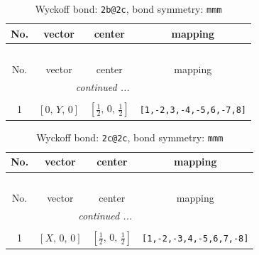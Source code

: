 \documentclass[fleqn,8pt]{jsarticle}
\begin{document}
\renewcommand{\arraystretch}{1.2}
\begin{longtable}{cccc}
\caption{Wyckoff bond: {\tt 2b@2c}, bond symmetry: {\tt mmm}}
 \\
 \hline \hline
No. & vector & center & mapping \\ \hline \endfirsthead

\multicolumn{3}{l}{\tablename\ \thetable{}} \\
 \hline \hline
No. & vector & center & mapping \\ \hline \endhead

 \hline \hline
\multicolumn{3}{r}{\footnotesize\it continued ...} \\ \endfoot

 \hline \hline
\multicolumn{3}{r}{} \\ \endlastfoot

1 & $\left[ 0,\, Y,\, 0 \right]$ & $\left[ \frac{1}{2},\, 0,\, \frac{1}{2} \right]$ & {\tt [1,-2,3,-4,-5,6,-7,8]} \\
\end{longtable}
\renewcommand{\arraystretch}{1.2}
\begin{longtable}{cccc}
\caption{Wyckoff bond: {\tt 2c@2c}, bond symmetry: {\tt mmm}}
 \\
 \hline \hline
No. & vector & center & mapping \\ \hline \endfirsthead

\multicolumn{3}{l}{\tablename\ \thetable{}} \\
 \hline \hline
No. & vector & center & mapping \\ \hline \endhead

 \hline \hline
\multicolumn{3}{r}{\footnotesize\it continued ...} \\ \endfoot

 \hline \hline
\multicolumn{3}{r}{} \\ \endlastfoot

1 & $\left[ X,\, 0,\, 0 \right]$ & $\left[ \frac{1}{2},\, 0,\, \frac{1}{2} \right]$ & {\tt [1,-2,-3,4,-5,6,7,-8]} \\
\end{longtable}
\renewcommand{\arraystretch}{1.2}
\end{document}

